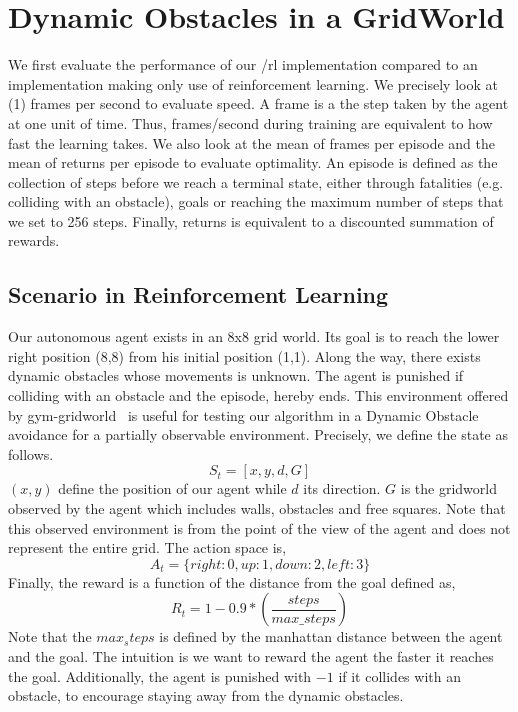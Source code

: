 \section{Dynamic Obstacles in a GridWorld} 
\label{gridworlddyn}
We first evaluate the performance of our \dio{}/rl implementation compared to an implementation making only use of reinforcement learning. 
We precisely look at (1) frames per second to evaluate speed. A \gls{frame} is a the step taken by the agent at one unit of time. Thus, frames/second 
during training are equivalent to how fast the learning takes. We also look at the mean of frames per episode and the mean of returns per episode to evaluate 
optimality. An \gls{episode} is defined as the collection of steps before we reach a terminal state, either 
through fatalities (e.g. colliding with an obstacle), goals or reaching the maximum number of steps that we set to 256 steps.
Finally, \glspl{return} is equivalent to a discounted summation of rewards. 
\subsection{Scenario in Reinforcement Learning}

Our autonomous agent exists in an 8x8 grid world. Its goal is to reach
the lower right position (8,8) from his initial position (1,1).
Along the way, there exists dynamic obstacles whose movements is
unknown. The agent is punished if colliding with an obstacle and the
\gls{episode}, hereby ends. 
This environment offered by gym-gridworld~\cite{gym_minigrid} is useful for testing our algorithm in a Dynamic Obstacle avoidance for a partially observable 
environment. Precisely, we define the state as follows. 
\begin{equation*}
  S_t = [x, y, d, G]
\end{equation*}
$(x,y)$ define the position of our agent while $d$ its direction. $G$
is the gridworld observed by the agent which includes walls, obstacles
and free squares. Note that this observed environment is from the point of the view 
of the agent and does not represent the entire grid. 
The action space is, 
\begin{equation*}
  A_t = \{ right: 0, up: 1, down: 2, left: 3 \}
\end{equation*}
Finally, the reward is a function of the distance from the goal
defined as, 
\begin{equation*}
  R_t = 1 - 0.9*(\dfrac{steps}{max\_steps})
\end{equation*}
Note that the $max_steps$ is defined by the manhattan distance between the agent and the goal. The intuition is 
we want to reward the agent the faster it reaches the goal. Additionally, the agent is punished with $-1$ if it collides with 
an obstacle, to encourage staying away from the dynamic obstacles. 
\newpage

